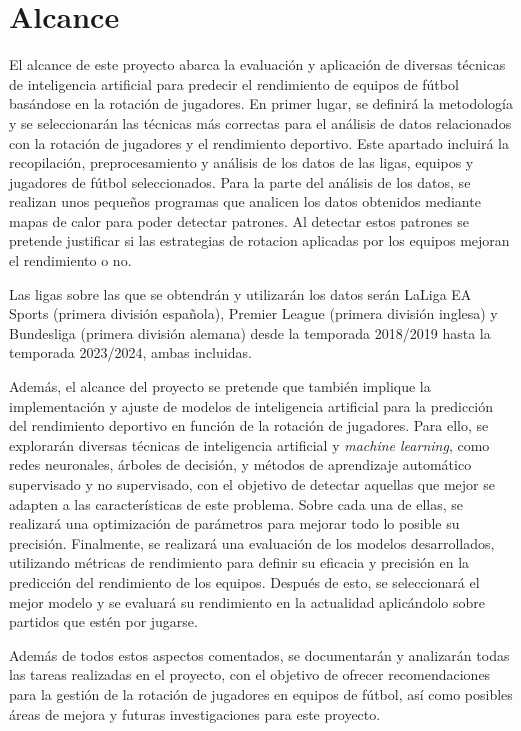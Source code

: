 \section{Alcance}
El alcance de este proyecto abarca la evaluación y aplicación de diversas técnicas de inteligencia artificial para predecir el rendimiento de equipos de fútbol basándose en la rotación de jugadores. En primer lugar, se definirá la metodología y se seleccionarán las técnicas más correctas para el análisis de datos relacionados con la rotación de jugadores y el rendimiento deportivo. Este apartado incluirá la recopilación, preprocesamiento y análisis de los datos de las ligas, equipos y jugadores de fútbol seleccionados. Para la parte del análisis de los datos, se realizan unos pequeños programas que analicen los datos obtenidos mediante mapas de calor para poder detectar patrones. Al detectar estos patrones se pretende justificar si las estrategias de rotacion aplicadas por los equipos mejoran el rendimiento o no.

Las ligas sobre las que se obtendrán y utilizarán los datos serán LaLiga EA Sports (primera división española), Premier League (primera división inglesa) y Bundesliga (primera división alemana) desde la temporada 2018/2019 hasta la temporada 2023/2024, ambas incluidas.

Además, el alcance del proyecto se pretende que también implique la implementación y ajuste de modelos de inteligencia artificial para la predicción del rendimiento deportivo en función de la rotación de jugadores. Para ello, se explorarán diversas técnicas de inteligencia artificial y \textit{machine learning}, como redes neuronales, árboles de decisión, y métodos de aprendizaje automático supervisado y no supervisado, con el objetivo de detectar aquellas que mejor se adapten a las características de este problema. Sobre cada una de ellas, se realizará una optimización de parámetros para mejorar todo lo posible su precisión.
Finalmente, se realizará una evaluación de los modelos desarrollados, utilizando métricas de rendimiento para definir su eficacia y precisión en la predicción del rendimiento de los equipos. Después de esto, se seleccionará el mejor modelo y se evaluará su rendimiento en la actualidad aplicándolo sobre partidos que estén por jugarse.

Además de todos estos aspectos comentados, se documentarán y analizarán todas las tareas realizadas en el proyecto, con el objetivo de ofrecer recomendaciones para la gestión de la rotación de jugadores en equipos de fútbol, así como posibles áreas de mejora y futuras investigaciones para este proyecto.




